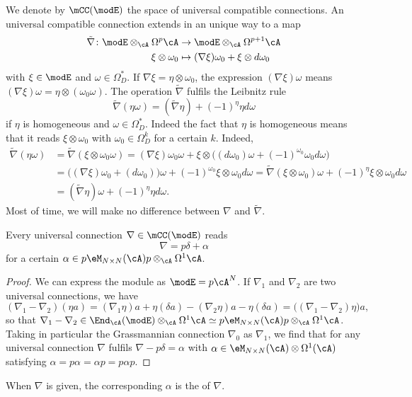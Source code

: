We denote by $\mCC(\modE)$ the space of universal compatible connections. An universal compatible connection extends in an unique way to a map
\begin{equation}
	\begin{aligned}
		\tilde\nabla\colon \modE\otimes_{\cA}\Omega^p\cA & \to \modE\otimes_{\cA}\Omega^{p+1}\cA            \\
		\xi\otimes\omega_0                               & \mapsto (\nabla\xi)\omega_0+\xi\otimes d\omega_0
	\end{aligned}
\end{equation}
with $\xi\in\modE$ and $\omega\in\Omega^*_D$. If $\nabla\xi=\eta\otimes\omega_0$, the expression $(\nabla\xi)\omega$ means $(\nabla\xi)\omega=\eta\otimes(\omega_0\omega)$. The operation $\tilde\nabla$ fulfils the Leibnitz rule
\[
	\tilde\nabla(\eta\omega)=(\tilde\nabla\eta)+(-1)^{\eta}\eta d\omega
\]
if $\eta$ is homogeneous and $\omega\in\Omega^*_D$. Indeed the fact that $\eta$ is homogeneous means that it reads $\xi\otimes\omega_0$ with $\omega_0\in\Omega_D^k$     for a certain $k$. Indeed,
\[
	\begin{split}
		\tilde\nabla(\eta\omega)&=\tilde\nabla(\xi\otimes\omega_0\omega)=(\nabla\xi)\omega_0\omega+\xi\otimes\big( (d\omega_0)\omega+(-1)^{\omega_0}\omega_0 d\omega \big)\\
		&=\big( (\nabla\xi)\omega_0+(d\omega_0) \big)\omega+(-1)^{\omega_0}\xi\otimes\omega_0 d\omega
		=\tilde\nabla(\xi\otimes\omega_0)\omega+(-1)^{\eta}\xi\otimes\omega_0 d\omega\\
		&=(\tilde\nabla\eta)\omega+(-1)^{\eta}\eta d\omega.
	\end{split}
\]
Most of time, we will make no difference between $\nabla$ and $\tilde\nabla$.

\begin{lemma}
	Every universal connection $\nabla\in\mCC(\modE)$ reads
	\begin{equation}\label{EqDefConnpdapha}
		\nabla = p\delta+\alpha
	\end{equation}
	for a certain $\alpha\in p\eM_{N\times N}(\cA)p\otimes_{\cA}\Omega^1\cA$.
\end{lemma}

\begin{proof}
	We can express the module as $\modE=p\cA^N$. If $\nabla_1$ and $\nabla_2$ are two universal connections, we have
	\[
		(\nabla_1-\nabla_2)(\eta a)=(\nabla_1\eta)a+\eta(\delta a)-(\nabla_2\eta)a-\eta(\delta a)=\big( (\nabla_1-\nabla_2)\eta \big)a,
	\]
	so that $\nabla_1-\nabla_2\in\End_{\cA}(\modE)\otimes_{\cA}\Omega^1\cA\simeq p\eM_{N\times N}(\cA)p\otimes_{\cA}\Omega^1\cA$. Taking in particular the Grassmannian connection $\nabla_0$ as $\nabla_1$, we find that for any universal connection $\nabla$ fulfils $\nabla-p\delta=\alpha$ with $\alpha\in\eM_{N\times N}(\cA)\otimes\Omega^1(\cA)$ satisfying $\alpha=p\alpha=\alpha p=p\alpha p$.
\end{proof}
When $\nabla$ is given, the corresponding $\alpha$ is the  of $\nabla$.


